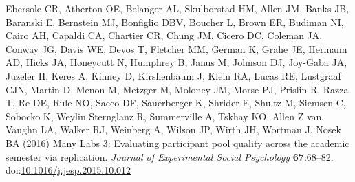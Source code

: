 \documentclass[
  english,
  a4paper,
]{article}
\newlength{\cslhangindent}
\newlength{\cslentryspacingunit} %
\newenvironment{CSLReferences}[2] %
 {%
  \setlength{\parindent}{0pt}
  \ifodd #1
  \let\oldpar\par
  \def\par{\hangindent=\cslhangindent\oldpar}
  \fi
  \setlength{\parskip}{#2\cslentryspacingunit}
 }%
 {}
\begin{document}
\begin{CSLReferences}{1}{0}
\leavevmode{}%
Ebersole CR, Atherton OE, Belanger AL, Skulborstad HM, Allen JM, Banks JB, Baranski E, Bernstein MJ, Bonfiglio DBV, Boucher L, Brown ER, Budiman NI, Cairo AH, Capaldi CA, Chartier CR, Chung JM, Cicero DC, Coleman JA, Conway JG, Davis WE, Devos T, Fletcher MM, German K, Grahe JE, Hermann AD, Hicks JA, Honeycutt N, Humphrey B, Janus M, Johnson DJ, Joy-Gaba JA, Juzeler H, Keres A, Kinney D, Kirshenbaum J, Klein RA, Lucas RE, Lustgraaf CJN, Martin D, Menon M, Metzger M, Moloney JM, Morse PJ, Prislin R, Razza T, Re DE, Rule NO, Sacco DF, Sauerberger K, Shrider E, Shultz M, Siemsen C, Sobocko K, Weylin Sternglanz R, Summerville A, Tskhay KO, Allen Z van, Vaughn LA, Walker RJ, Weinberg A, Wilson JP, Wirth JH, Wortman J, Nosek BA (2016) Many {Labs} 3: {Evaluating} participant pool quality across the academic semester via replication. \emph{Journal of Experimental Social Psychology} \textbf{67}:68--82. doi:\href{https://doi.org/10.1016/j.jesp.2015.10.012}{10.1016/j.jesp.2015.10.012}


\end{CSLReferences}
\end{document}
